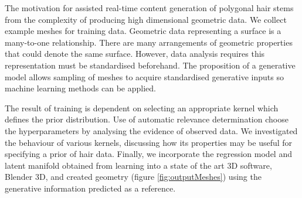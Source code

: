 \documentclass[ %
author={Dillon Keith Diep},
supervisor={Dr. Carl Henrik Ek},
degree={MEng},
title={ART-CG Hair:},
subtitle={Assisted Real-time Content Generation of Stylised Virtual Hair},
type={Research},
year={2017} ]{dissertation}
\begin{document}
The motivation for assisted real-time content generation of polygonal hair stems from the complexity of producing high dimensional geometric data. We collect example meshes for training data. Geometric data representing a surface is a many-to-one relationship. There are many arrangements of geometric properties that could denote the same surface. However, data analysis requires this representation must be standardised beforehand. The proposition of a generative model allows sampling of meshes to acquire standardised generative inputs so machine learning methods can be applied.

The result of training is dependent on selecting an appropriate kernel which defines the prior distribution. Use of automatic relevance determination choose the hyperparameters by analysing the evidence of observed data. We investigated the behaviour of various kernels, discussing how its properties may be useful for specifying a prior of hair data. Finally, we incorporate the regression model and latent manifold obtained from learning into a state of the art 3D software, Blender 3D, and created geometry (figure \ref{fig:outputMeshes}) using the generative information predicted as a reference.
\end{document}
